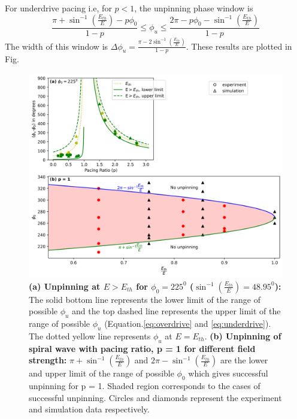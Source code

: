 For underdrive pacing i.e, for $p<1$, the unpinning phase window is 
\begin{equation}
\frac{\pi+ {\sin^{-1}}(\frac{E_{th}}{E})-p \phi_0}{1-p}   \leq \phi_u \leq \frac{2\pi-p \phi_0-{\sin^{-1}}(\frac{E_{th}}{E})}{1-p}
\label{eq:underdrive}
\end{equation}
The width of this window is $\Delta\phi_u = \frac{\pi - 2 \sin^{-1}(\frac{E_{th}}{E})}{1-p}$. These results are plotted in Fig.

\begin{figure}[htb!]
    \centering
    \includegraphics[scale=0.7]{E.png}
    \caption{\textbf{(a) Unpinning at $E>E_{th}$ for ${\phi}_0 = 225^0$
	(${\sin^{-1}}{(\frac{E_{th}}{E})}=48.95^0$):} The solid bottom line
	represents the lower limit of the range of possible ${\phi}_u$ and the
	top dashed line represents the upper limit of the range of possible
	${\phi}_u$ (Equation.\ref{eq:overdrive} and \ref{eq:underdrive}). The
	dotted yellow line represents ${\phi}_u$ at $E=E_{th}$.  \textbf{(b)
	Unpinning of spiral wave with pacing ratio, p = 1 for different field
	strength:} $\pi+{\sin^{-1}}{(\frac{E_{th}}{E})}$ and
	$2\pi-{\sin^{-1}}{(\frac{E_{th}}{E})}$ are the lower and upper limit of
	the range of possible ${\phi}_0$ which gives successful unpinning for p
	= 1. Shaded region corresponds to the cases of successful unpinning.
    Circles and diamonds represent the experiment and simulation data
	respectively.} \label{fig:E_p1}
\end{figure}

